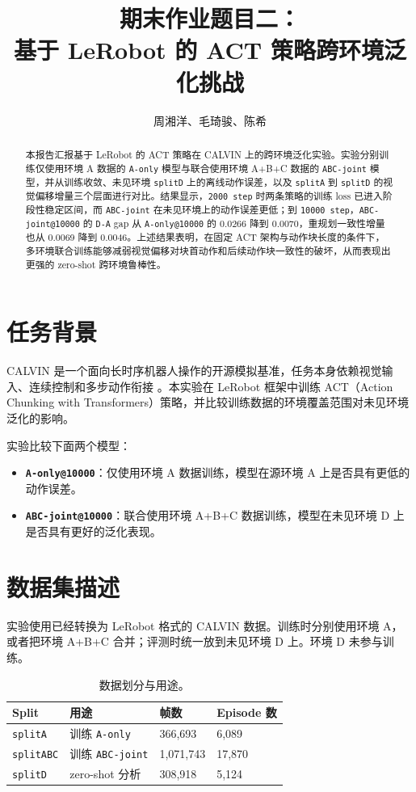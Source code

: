 \documentclass{article}
\title{期末作业题目二：\\基于 LeRobot 的 ACT 策略跨环境泛化挑战}
\author{%
  周湘洋、毛琦骏、陈希
}
\begin{document}
\maketitle

\begin{abstract}
本报告汇报基于 LeRobot 的 ACT 策略在 CALVIN 上的跨环境泛化实验。实验分别训练仅使用环境 A 数据的 \texttt{A-only} 模型与联合使用环境 A+B+C 数据的 \texttt{ABC-joint} 模型，并从训练收敛、未见环境 \texttt{splitD} 上的离线动作误差，以及 \texttt{splitA} 到 \texttt{splitD} 的视觉偏移增量三个层面进行对比。结果显示，\texttt{2000 step} 时两条策略的训练 loss 已进入阶段性稳定区间，而 \texttt{ABC-joint} 在未见环境上的动作误差更低；到 \texttt{10000 step}，\texttt{ABC-joint@10000} 的 \texttt{D-A} gap 从 \texttt{A-only@10000} 的 0.0266 降到 0.0070，重规划一致性增量也从 0.0069 降到 0.0046。上述结果表明，在固定 ACT 架构与动作块长度的条件下，多环境联合训练能够减弱视觉偏移对块首动作和后续动作块一致性的破坏，从而表现出更强的 zero-shot 跨环境鲁棒性。
\end{abstract}

\section{任务背景}

CALVIN 是一个面向长时序机器人操作的开源模拟基准，任务本身依赖视觉输入、连续控制和多步动作衔接 \citep{mees2021calvin}。本实验在 LeRobot 框架中训练 ACT（Action Chunking with Transformers）策略，并比较训练数据的环境覆盖范围对未见环境泛化的影响。

实验比较下面两个模型：
\begin{itemize}
  \item \textbf{\texttt{A-only@10000}}：仅使用环境 A 数据训练，模型在源环境 A 上是否具有更低的动作误差。
  \item \textbf{\texttt{ABC-joint@10000}}：联合使用环境 A+B+C 数据训练，模型在未见环境 D 上是否具有更好的泛化表现。
\end{itemize}

\section{数据集描述}

实验使用已经转换为 LeRobot 格式的 CALVIN 数据。训练时分别使用环境 A，或者把环境 A+B+C 合并；评测时统一放到未见环境 D 上。环境 D 未参与训练。

\begin{table}[H]
  \centering
  \small
  \caption{数据划分与用途。}
  \label{tab:data_splits}
  \begin{tabular}{L{2.0cm}L{3.2cm}C{1.8cm}C{1.8cm}}
    \toprule
    Split & 用途 & 帧数 & Episode 数 \\
    \midrule
    \texttt{splitA} & 训练 \texttt{A-only} & 366,693 & 6,089 \\
    \texttt{splitABC} & 训练 \texttt{ABC-joint} & 1,071,743 & 17,870 \\
    \texttt{splitD} & zero-shot 分析 & 308,918 & 5,124 \\
    \bottomrule
  \end{tabular}
\end{table}
\end{document}
